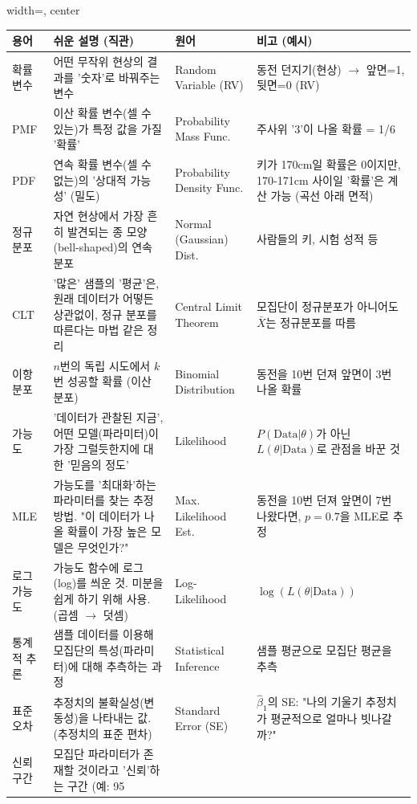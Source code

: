\documentclass[11pt,a4paper]{book}
\theoremstyle{definition}
\begin{document}
\begin{adjustbox}{width=\textwidth, center}
\begin{tabular}{lp{6cm}p{4cm}l}
\toprule
\textbf{용어} & \textbf{쉬운 설명 (직관)} & \textbf{원어} & \textbf{비고 (예시)} \\
\midrule
확률 변수 & 어떤 무작위 현상의 결과를 '숫자'로 바꿔주는 변수 & Random Variable (RV) & 동전 던지기(현상) $\to$ 앞면=1, 뒷면=0 (RV) \\
PMF & 이산 확률 변수(셀 수 있는)가 특정 값을 가질 '확률' & Probability Mass Func. & 주사위 '3'이 나올 확률 = 1/6 \\
PDF & 연속 확률 변수(셀 수 없는)의 '상대적 가능성' (밀도) & Probability Density Func. & 키가 170cm일 확률은 0이지만, 170-171cm 사이일 '확률'은 계산 가능 (곡선 아래 면적) \\
정규 분포 & 자연 현상에서 가장 흔히 발견되는 종 모양(bell-shaped)의 연속 분포 & Normal (Gaussian) Dist. & 사람들의 키, 시험 성적 등 \\
CLT & '많은' 샘플의 '평균'은, 원래 데이터가 어떻든 상관없이, 정규 분포를 따른다는 마법 같은 정리 & Central Limit Theorem & 모집단이 정규분포가 아니어도 $\bar{X}$는 정규분포를 따름 \\
이항 분포 & $n$번의 독립 시도에서 $k$번 성공할 확률 (이산 분포) & Binomial Distribution & 동전을 10번 던져 앞면이 3번 나올 확률 \\
가능도 & '데이터가 관찰된 지금', 어떤 모델(파라미터)이 가장 그럴듯한지에 대한 '믿음의 정도' & Likelihood & $P(\text{Data}|\theta)$가 아닌 $L(\theta|\text{Data})$로 관점을 바꾼 것 \\
MLE & 가능도를 '최대화'하는 파라미터를 찾는 추정 방법. "이 데이터가 나올 확률이 가장 높은 모델은 무엇인가?" & Max. Likelihood Est. & 동전을 10번 던져 앞면이 7번 나왔다면, $p=0.7$을 MLE로 추정 \\
로그 가능도 & 가능도 함수에 로그(log)를 씌운 것. 미분을 쉽게 하기 위해 사용. (곱셈 $\to$ 덧셈) & Log-Likelihood & $\log(L(\theta|\text{Data}))$ \\
통계적 추론 & 샘플 데이터를 이용해 모집단의 특성(파라미터)에 대해 추측하는 과정 & Statistical Inference & 샘플 평균으로 모집단 평균을 추측 \\
표준 오차 & 추정치의 불확실성(변동성)을 나타내는 값. (추정치의 표준 편차) & Standard Error (SE) & $\hat{\beta}_1$의 SE: "나의 기울기 추정치가 평균적으로 얼마나 빗나갈까?" \\
신뢰 구간 & 모집단 파라미터가 존재할 것이라고 '신뢰'하는 구간 (예: 95%

\end{tabular}
\end{adjustbox}
\end{document}
